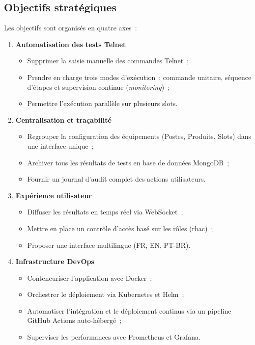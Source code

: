 \subsection{Objectifs stratégiques}

Les objectifs sont organisés en quatre axes~:

\begin{enumerate}
  \item \textbf{Automatisation des tests Telnet}
    \begin{itemize}
      \item Supprimer la saisie manuelle des commandes Telnet~;
      \item Prendre en charge trois modes d'exécution~: commande unitaire,
            séquence d'étapes et supervision continue (\textit{monitoring})~;
      \item Permettre l'exécution parallèle sur plusieurs slots.
    \end{itemize}

  \item \textbf{Centralisation et traçabilité}
    \begin{itemize}
      \item Regrouper la configuration des équipements (Postes, Produits,
            Slots) dans une interface unique~;
      \item Archiver tous les résultats de tests en base de données
            MongoDB~;
      \item Fournir un journal d'audit complet des actions utilisateurs.
    \end{itemize}

  \item \textbf{Expérience utilisateur}
    \begin{itemize}
      \item Diffuser les résultats en temps réel via WebSocket~;
      \item Mettre en place un contrôle d'accès basé sur les rôles
            (\gls{rbac})~;
      \item Proposer une interface multilingue (FR, EN, PT-BR).
    \end{itemize}

  \item \textbf{Infrastructure DevOps}
    \begin{itemize}
      \item Conteneuriser l'application avec Docker~;
      \item Orchestrer le déploiement via Kubernetes et Helm~;
      \item Automatiser l'intégration et le déploiement continus via un
            pipeline GitHub Actions auto-hébergé~;
      \item Superviser les performances avec Prometheus et Grafana.
    \end{itemize}
\end{enumerate}

